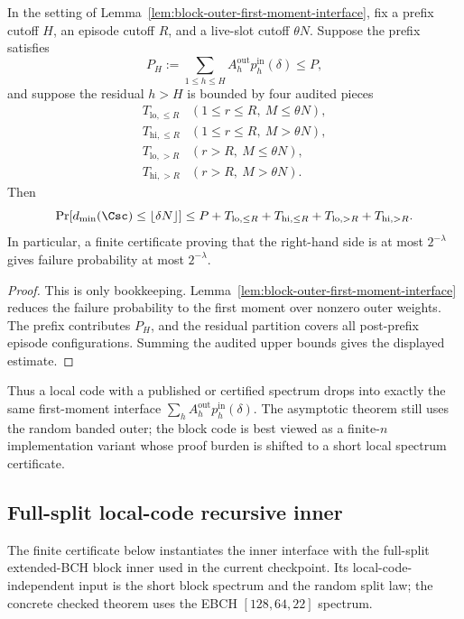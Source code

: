 \begin{lemma}
\label{lem:finite-block-certificate-template}
In the setting of Lemma~\ref{lem:block-outer-first-moment-interface}, fix a prefix cutoff \(H\), an episode cutoff
\(R\), and a live-slot cutoff \(\theta N\).  Suppose the prefix satisfies
\[
P_H:=\sum_{1\le h\le H} A_h^{\mathrm{out}}p_h^{\mathrm{in}}(\delta)\le P,
\]
and suppose the residual \(h>H\) is bounded by four audited pieces
\[
\begin{array}{ll}
T_{\mathrm{lo},\le R} & (1\le r\le R,\ M\le\theta N),\\
T_{\mathrm{hi},\le R} & (1\le r\le R,\ M>\theta N),\\
T_{\mathrm{lo},>R} & (r>R,\ M\le\theta N),\\
T_{\mathrm{hi},>R} & (r>R,\ M>\theta N).
\end{array}
\]
Then
\[
\Pr[d_{\min}(\Csc)\le \lfloor\delta N\rfloor]
\le
P+T_{\mathrm{lo},\le R}+T_{\mathrm{hi},\le R}+T_{\mathrm{lo},>R}+T_{\mathrm{hi},>R}.
\]
In particular, a finite certificate proving that the right-hand side is at most \(2^{-\lambda}\) gives failure
probability at most \(2^{-\lambda}\).
\end{lemma}

\begin{proof}
This is only bookkeeping.  Lemma~\ref{lem:block-outer-first-moment-interface} reduces the failure probability to the
first moment over nonzero outer weights.  The prefix contributes \(P_H\), and the residual partition covers all
post-prefix episode configurations.  Summing the audited upper bounds gives the displayed estimate.
\end{proof}

Thus a local code with a published or certified spectrum drops into exactly the same first-moment interface
\(\sum_h A_h^{\mathrm{out}}p_h^{\mathrm{in}}(\delta)\).  The asymptotic theorem still uses the random banded outer; the
block code is best viewed as a finite-\(n\) implementation variant whose proof burden is shifted to a short local
spectrum certificate.


\subsection{Full-split local-code recursive inner}
\label{subsec:fullsplit-local-code-inner}

The finite certificate below instantiates the inner interface with the full-split extended-BCH block inner used in the
current checkpoint.  Its local-code-independent input is the short block spectrum and the random split law; the concrete
checked theorem uses the EBCH \([128,64,22]\) spectrum.

